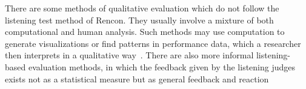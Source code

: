 There are some methods of qualitative evaluation which do not follow the listening test method of Rencon. They usually involve a mixture of both computational and human analysis. Such methods may use computation to generate visualizations or find patterns in performance data, which a researcher then interprets in a qualitative way~\cite{widmer2009yqx,jeong2019score, grachten2012linear}. There are also more informal listening-based evaluation methods, in which the feedback given by the listening judges exists not as a statistical measure but as general feedback and reaction~\cite{oore2020time}
